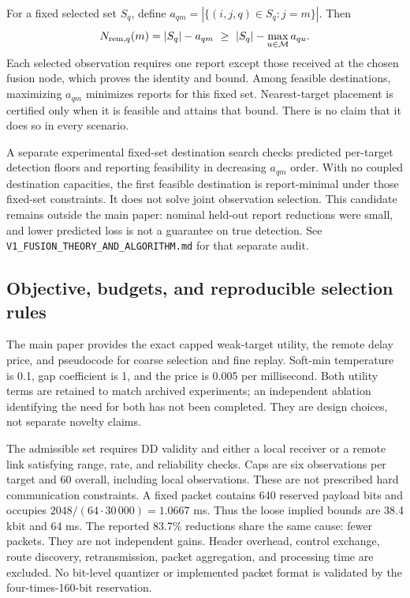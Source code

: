 \documentclass[10pt]{article}
\begin{document}
For a fixed selected set $S_q$, define
$a_{qm}=|\{(i,j,q)\in S_q:j=m\}|$. Then
\[
 N_{{\rm rem},q}(m)=|S_q|-a_{qm}
 \ \ge\ |S_q|-\max_{u\in{\cal M}}a_{qu}.
\]
Each selected observation requires one report except those received at the
chosen fusion node, which proves the identity and bound. Among feasible
destinations, maximizing $a_{qm}$ minimizes reports for this fixed set.
Nearest-target placement is certified only when it is feasible and attains
that bound. There is no claim that it does so in every scenario.

A separate experimental fixed-set destination search checks predicted
per-target detection floors and reporting feasibility in decreasing $a_{qm}$
order. With no coupled destination capacities, the first feasible destination
is report-minimal under those fixed-set constraints. It does not solve joint
observation selection. This candidate remains outside the main paper:
nominal held-out report reductions were small, and lower predicted loss is
not a guarantee on true detection. See
\texttt{V1\_FUSION\_THEORY\_AND\_ALGORITHM.md} for that separate audit.

\subsection{Objective, budgets, and reproducible selection rules}
The main paper provides the exact capped weak-target utility, the remote
delay price, and pseudocode for coarse selection and fine replay.
Soft-min temperature is 0.1, gap coefficient is 1, and the price is
0.005 per millisecond. Both utility terms are retained to match archived
experiments; an independent ablation identifying the need for both has not
been completed. They are design choices, not separate novelty claims.

The admissible set requires DD validity and either a local receiver or a
remote link satisfying range, rate, and reliability checks.
Caps are six observations per target and 60 overall, including local
observations. These are not prescribed hard communication constraints.
A fixed packet contains 640 reserved payload bits and occupies
$2048/(64\cdot30\,000)=1.0667$ ms. Thus the loose implied bounds are
38.4 kbit and 64 ms. The reported 83.7\% reductions share the same cause:
fewer packets. They are not independent gains. Header overhead, control
exchange, route discovery, retransmission, packet aggregation, and processing
time are excluded. No bit-level quantizer or implemented packet format is
validated by the four-times-160-bit reservation.
\end{document}
